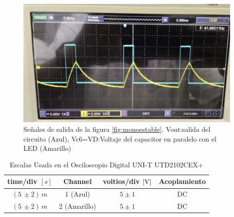             

            
            \begin{figure}[H]
                \centering
                \renewcommand{\figurename}{Imagen}
                \includegraphics[width=15cm]{Imagenes/exp_monoestable_vc_vout_dc.png}
                \caption{Señales de salida de la figura \ref{fig:monoestable}. Vout:salida del circuito (Azul), Vc6=VD:Voltaje del capacitor en paralelo con el LED (Amarillo)}
                \label{fig:exp_monoestable_vc_vout_dc}
            \end{figure}

            \begin{table}[H]
                \centering
                \begin{tabular}{|c|c|c|c|}
                    \hline
                    \textbf{time/div} $[s]$ & \textbf{Channel} & \textbf{voltios/div $[\volt]$} & \textbf{Acoplamiento} \\ \hline
                    $(5 \, \pm 2) \, m  $ & 1 (Azul)  &   $5 \pm 1   $ & DC \\ \hline  
                    $(5 \, \pm 2) \, m  $ & 2 (Amarillo)  &   $5 \pm 1   $ & DC \\ \hline  
                \end{tabular}
                \caption{Escalas Usada en el Osciloscopio Digital UNI-T UTD2102CEX+}
                \label{tab:escala_monoestable_vc_vout_dc}
            \end{table}

